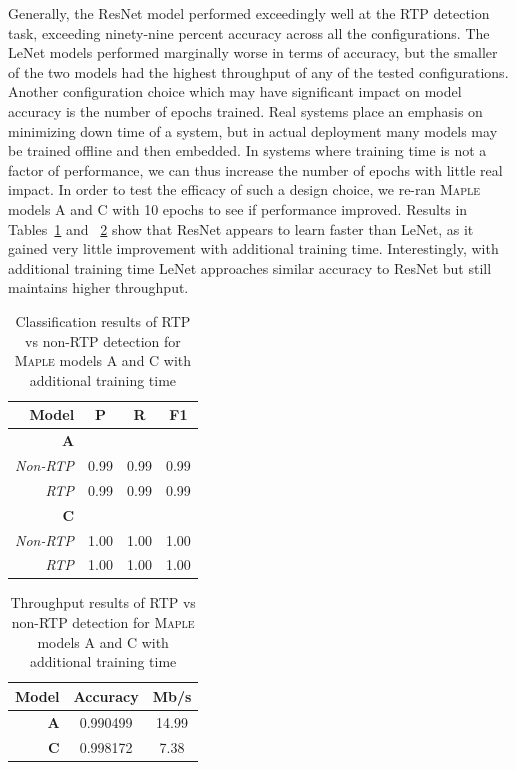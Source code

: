 Generally, the ResNet model performed exceedingly well at the RTP detection task, exceeding ninety-nine percent accuracy across all the configurations. The LeNet models performed marginally worse in terms of accuracy, but the smaller of the two models had the highest throughput of any of the tested configurations. Another configuration choice which may have significant impact on model accuracy is the number of epochs trained. Real systems place an emphasis on minimizing down time of a system, but in actual deployment many models may be trained offline and then embedded. In systems where training time is not a factor of performance, we can thus increase the number of epochs with little real impact. In order to test the efficacy of such a design choice, we re-ran \textsc{Maple} models A and C with 10 epochs to see if performance improved. Results in Tables~\ref{tab:addepoch1} and ~\ref{tab:addepoch2} show that ResNet appears to learn faster than LeNet, as it gained very little improvement with additional training time. Interestingly, with additional training time LeNet approaches similar accuracy to ResNet but still maintains higher throughput.

\begin{table} [h!]
\centering
\small
\begin{tabular}{| r | c | c | c |}
\hline
Model & P & R & F1 \\
\hline
\textbf{A} &&& \\
\textit{Non-RTP} & 0.99 & 0.99 & 0.99 \\
\textit{RTP} & 0.99 & 0.99 & 0.99 \\
\hline
\textbf{C} &&& \\
\textit{Non-RTP} & 1.00 & 1.00 & 1.00 \\
\textit{RTP} & 1.00 & 1.00 & 1.00 \\
\hline
\end{tabular}
\caption{Classification results of RTP vs non-RTP detection for \textsc{Maple} models A and C with additional training time}
\label{tab:addepoch1}
\end{table}

\begin{table} [h!]
\centering
\small
\begin{tabular}{| r | c | c |}
\hline
Model & Accuracy & Mb/s \\
\hline
\textbf{A} & 0.990499 & 14.99 \\
\hline
\textbf{C} & 0.998172 & 7.38 \\
\hline
\end{tabular}
\caption{Throughput results of RTP vs non-RTP detection for \textsc{Maple} models A and C with additional training time}
\label{tab:addepoch2}
\end{table}

